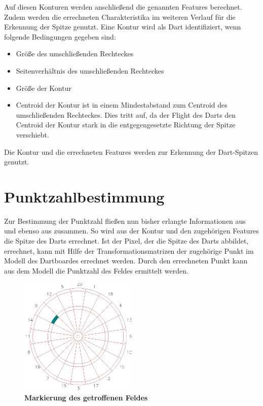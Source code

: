 Auf diesen Konturen werden anschließend die genannten Features berechnet.
Zudem werden die errechneten Charakteristika im weiteren Verlauf für die Erkennung der Spitze genutzt.
Eine Kontur wird als Dart identifiziert, wenn folgende Bedingungen gegeben sind:
\begin{itemize}
	\item Größe des umschließenden Rechteckes
	\item Seitenverhältnis des umschließenden Rechteckes
	\item Größe der Kontur
	\item Centroid der Kontur ist in einem Mindestabstand zum Centroid des umschließenden Rechteckes. Dies tritt auf, da der Flight des Darts den Centroid der Kontur stark in die entgegengesetzte Richtung der Spitze verschiebt. 
\end{itemize}

Die Kontur und die errechneten Features werden zur Erkennung der Dart-Spitzen genutzt.

\section{Punktzahlbestimmung}
\label{sec:score}
Zur Bestimmung der Punktzahl fließen nun bisher erlangte Informationen aus  und ebenso aus  zusammen.
So wird aus der Kontur und den zugehörigen Features die Spitze des Darts errechnet. Ist der Pixel, der die Spitze des Darts abbildet, errechnet, kann mit Hilfe der Transformationsmatrizen der zugehörige Punkt im Modell des Dartboardes errechnet werden. Durch den errechneten Punkt kann aus dem Modell die Punktzahl des Feldes ermittelt werden. 

\begin{figure}[ht]
\centering
\includegraphics[width=0.5\textwidth]{media/pointimg}
\caption{\textbf{Markierung des getroffenen Feldes}}
\label{Fig:acceptingimg}
\end{figure}

